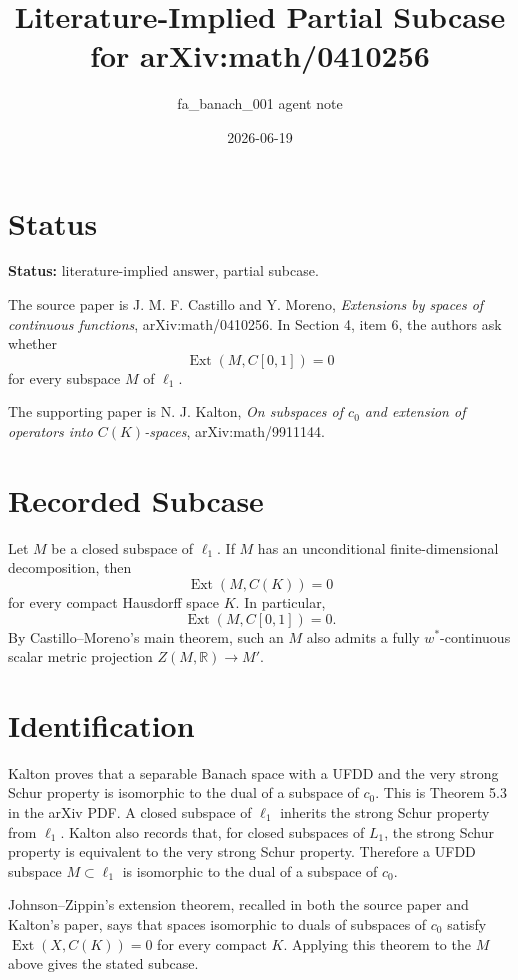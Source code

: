 \documentclass[11pt]{article}
\title{Literature-Implied Partial Subcase for arXiv:math/0410256}
\author{fa\_banach\_001 agent note}
\date{2026-06-19}
\newcommand{\Ext}{\operatorname{Ext}}
\begin{document}
\maketitle

\section*{Status}

\textbf{Status:} literature-implied answer, partial subcase.

The source paper is J. M. F. Castillo and Y. Moreno,
\emph{Extensions by spaces of continuous functions}, arXiv:math/0410256.
In Section 4, item 6, the authors ask whether
\[
  \Ext(M,C[0,1])=0
\]
for every subspace \(M\) of \(\ell_1\).

The supporting paper is N. J. Kalton,
\emph{On subspaces of \(c_0\) and extension of operators into \(C(K)\)-spaces},
arXiv:math/9911144.

\section*{Recorded Subcase}

Let \(M\) be a closed subspace of \(\ell_1\).  If \(M\) has an unconditional
finite-dimensional decomposition, then
\[
  \Ext(M,C(K))=0
\]
for every compact Hausdorff space \(K\).  In particular,
\[
  \Ext(M,C[0,1])=0.
\]
By Castillo--Moreno's main theorem, such an \(M\) also admits a fully
\(w^\ast\)-continuous scalar metric projection \(Z(M,\mathbb R)\to M'\).

\section*{Identification}

Kalton proves that a separable Banach space with a UFDD and the very strong
Schur property is isomorphic to the dual of a subspace of \(c_0\).  This is
Theorem 5.3 in the arXiv PDF.  A closed subspace of \(\ell_1\) inherits the
strong Schur property from \(\ell_1\).  Kalton also records that, for closed
subspaces of \(L_1\), the strong Schur property is equivalent to the very
strong Schur property.  Therefore a UFDD subspace \(M\subset \ell_1\) is
isomorphic to the dual of a subspace of \(c_0\).

Johnson--Zippin's extension theorem, recalled in both the source paper and
Kalton's paper, says that spaces isomorphic to duals of subspaces of \(c_0\)
satisfy \(\Ext(X,C(K))=0\) for every compact \(K\).  Applying this theorem to
the \(M\) above gives the stated subcase.
\end{document}
